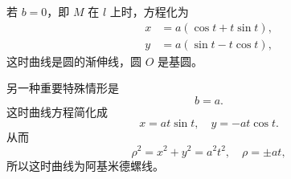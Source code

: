 若 $b = 0$，即 $M$ 在 $l$ 上时，方程化为
\begin{align*}
  x &= a(\cos t + t\sin t), \\
  y &= a(\sin t - t\cos t),
\end{align*}
这时曲线是圆的渐伸线，圆 $O$ 是基圆。

另一种重要特殊情形是
\[
  b = a.
\]
这时曲线方程简化成
\[
  x = at\sin t,\quad y = -at\cos t.
\]
从而
\[
  \rho^2 = x^2 + y^2 = a^2 t^2,\quad \rho = \pm at,
\]
所以这时曲线为阿基米德螺线。
